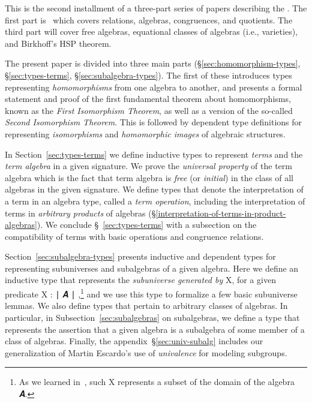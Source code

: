 \documentclass[a4paper,UKenglish,cleveref,autoref,thm-restate,12pt]{../lipics-v2021-wjd}
\begin{document}
This is the second installment of a three-part series of papers describing the \agdaualib. The first part is~\cite{DeMeo:2021-1} which covers relations, algebras, congruences, and quotients. The third part will cover free algebras, equational classes of algebras (i.e., varieties), and Birkhoff's HSP theorem.

The present paper is divided into three main parts (\S\ref{sec:homomorphism-types}, \S\ref{sec:types-terms}, \S\ref{sec:subalgebra-types}).  The first of these introduces types representing \emph{homomorphisms} from one algebra to another, and presents a formal statement and proof of the first fundamental theorem about homomorphisms, known as the \emph{First Isomorphism Theorem}, as well as a version of the so-called \emph{Second Isomorphism Theorem}. This is followed by dependent type definitions for representing \emph{isomorphisms} and \emph{homomorphic images} of algebraic structures.

In Section~\ref{sec:types-terms} we define inductive types to represent \emph{terms} and the \emph{term algebra} in a given signature. We prove the \emph{universal property} of the term algebra which is the fact that term algebra is \emph{free} (or \emph{initial}) in the class of all algebras in the given signature.  We define types that denote the interpretation of a term in an algebra type, called a \emph{term operation}, including the interpretation of terms in \emph{arbitrary products} of algebras (\S\ref{interpretation-of-terms-in-product-algebras}). We conclude \S~\ref{sec:types-terms} with a subsection on the compatibility of terms with basic operations and congruence relations.

Section~\ref{sec:subalgebra-types} presents inductive and dependent types for representing subuniverses and subalgebras of a given algebra. Here we define an inductive type that represents the \emph{subuniverse generated by} \ab X, for a given predicate \ab X \as :  \af ∣ \ab 𝑨 \af ∣ \AgdaUnderscore,\footnote{As we learned in~\cite{DeMeo:2021-1}, such \ab X represents a subset of the domain of the algebra \ab 𝑨.} and we use this type to formalize a few basic subuniverse lemmas.  We also define types that pertain to arbitrary classes of algebras. In particular, in Subsection~\ref{sec:subalgebras} on subalgebras, we define a type that represents the assertion that a given algebra is a subalgebra of some member of a class of algebras.  Finally, the appendix~\S\ref{sec:univ-subalg} includes our generalization of Martin Escardo's use of \emph{univalence} for modeling subgroups.
\end{document}
